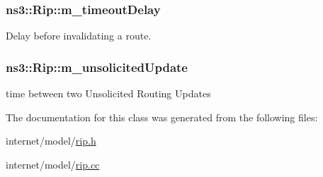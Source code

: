\subsubsection[{\texorpdfstring{m\+\_\+timeout\+Delay}{m_timeoutDelay}}]{ ns3\+::\+Rip\+::m\+\_\+timeout\+Delay\hspace{0.3cm}{\ttfamily [private]}}\hypertarget{classns3_1_1Rip_a8a684a47271e0e382dd5f485a8a5545b}{}\label{classns3_1_1Rip_a8a684a47271e0e382dd5f485a8a5545b}


Delay before invalidating a route. 

\subsubsection[{\texorpdfstring{m\+\_\+unsolicited\+Update}{m_unsolicitedUpdate}}]{ ns3\+::\+Rip\+::m\+\_\+unsolicited\+Update\hspace{0.3cm}{\ttfamily [private]}}\hypertarget{classns3_1_1Rip_aabc5098465aa38f416c5daa7561d3ea0}{}\label{classns3_1_1Rip_aabc5098465aa38f416c5daa7561d3ea0}


time between two Unsolicited Routing Updates 



The documentation for this class was generated from the following files\+:\begin{DoxyCompactItemize}
\item 
internet/model/\hyperlink{rip_8h}{rip.\+h}\item 
internet/model/\hyperlink{rip_8cc}{rip.\+cc}\end{DoxyCompactItemize}
